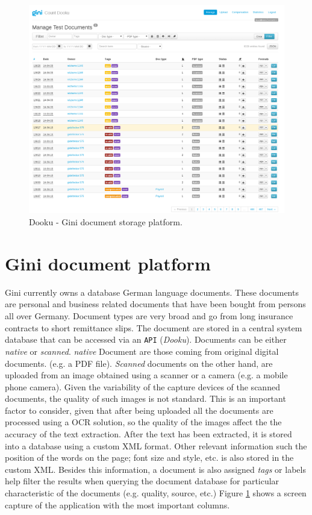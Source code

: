 \begin{figure}[h]
    \centering
    \includegraphics[width=\textwidth]{images/001-dooku-screenshot.png}
    \caption{Dooku - Gini document storage platform.}
    \label{fig:dooku_screenshot}
\end{figure}

\section{Gini document platform}
\label{sec:gini_doc_platform}

Gini currently owns a database  German language documents. These documents 
are personal and business related documents that have been bought 
from  persons all over Germany. Document types are very broad and go from
long insurance contracts to short remittance slips. The document are stored
in a central system database that can be accessed via an  \texttt{API} (\textsl{Dooku}).
Documents can be either \textit{native} or \textit{scanned}. 
\textit{native} Document are those  coming  from original digital documents. (e.g. a
PDF file). \textit{Scanned} documents on the other hand, are uploaded
from an image obtained using a scanner or a camera (e.g. a mobile phone 
camera). Given the variability of the capture devices of the scanned
documents, the quality of such images is not standard.
This is an important factor to consider, given that after being uploaded all the
documents are processed using a \ac{OCR} solution, so the quality of the
images affect the the accuracy of the text extraction. 
After the text has been extracted, it is stored  into a database using a custom
\textsc{XML} format. Other relevant information such the position of the
words on the page; font size and style, etc.  is also stored in the custom
\textsc{XML}.  Besides this information, a document is also assigned
\textit{tags} or labels help filter the results  when querying the document database for
particular characteristic of the documents
(e.g. quality, source, etc.)   Figure \ref{fig:dooku_screenshot} shows a screen capture of the application with the
most important columns.


